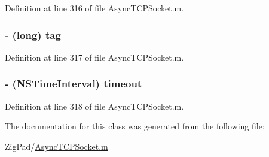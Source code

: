 Definition at line 316 of file AsyncTCPSocket.m.

\hypertarget{interface_async_write_packet_ae10c29173f0af40507d7e787905c7130}{
\subsubsection[{tag}]{\setlength{\rightskip}{0pt plus 5cm}-\/ (long) {\bf tag}}}
\label{interface_async_write_packet_ae10c29173f0af40507d7e787905c7130}


Definition at line 317 of file AsyncTCPSocket.m.

\hypertarget{interface_async_write_packet_a39233eb85b4cbae04411577510e7c5e6}{
\subsubsection[{timeout}]{\setlength{\rightskip}{0pt plus 5cm}-\/ (NSTimeInterval) {\bf timeout}}}
\label{interface_async_write_packet_a39233eb85b4cbae04411577510e7c5e6}


Definition at line 318 of file AsyncTCPSocket.m.



The documentation for this class was generated from the following file:\begin{DoxyCompactItemize}
\item 
ZigPad/\hyperlink{_async_t_c_p_socket_8m}{AsyncTCPSocket.m}\end{DoxyCompactItemize}
